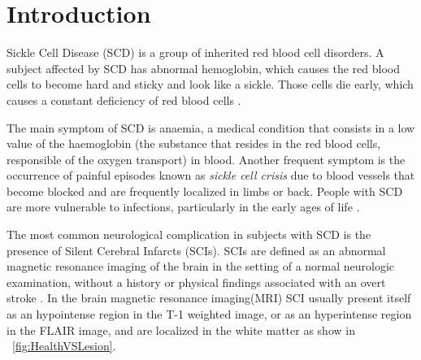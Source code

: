 \documentclass{standalone}
\begin{document}
\chapter*{Introduction}
Sickle Cell Disease (SCD) is a group of inherited red blood cell disorders. A subject affected by SCD has abnormal hemoglobin, which causes the red blood cells to become hard and sticky and look like a sickle. Those cells die early, which causes a constant deficiency of red blood cells \cite{SickleCell}.

The main symptom of SCD is anaemia, a medical condition that consists in a low value of the haemoglobin (the substance that resides in the red blood cells, responsible of the oxygen transport) in blood.
Another frequent symptom is the occurrence of painful episodes known as \textit{sickle cell crisis} due to blood vessels that become blocked and are frequently localized in limbs or back.
People with SCD are more vulnerable to infections, particularly in the early ages of life \cite{SickleCell_symptoms}.

The most common neurological complication in subjects with SCD is the presence of Silent Cerebral Infarcts (SCIs)\cite{ART:Pegelow}.
SCIs are defined as an abnormal magnetic resonance imaging of the brain in the setting of a normal neurologic examination, without a history or physical findings associated with an overt stroke \cite{ART:Debaun}.
In the brain magnetic resonance imaging(MRI) SCI usually present itself as an hypointense region in the T-1 weighted image, or as an hyperintense region in the FLAIR image, and are localized in the white matter as show in \figurename~\ref{fig:HealthVSLesion}.
\end{document}

